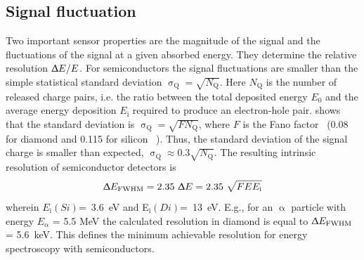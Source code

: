 \subsection{Signal fluctuation}
Two important sensor properties are the magnitude of the signal and the fluctuations of the signal at a given absorbed energy. They determine the relative resolution $\Updelta E/E$. For semiconductors the signal fluctuations are smaller than the simple statistical standard deviation $\upsigma_\mathrm{Q}=\sqrt{N_\mathrm{Q}}$. Here $N_\mathrm{Q}$ is the number of released charge pairs, i.e. the ratio between the total deposited energy $E_\mathrm{0}$ and the average energy deposition $E_\mathrm{i}$ required to produce an electron-hole pair. \cite{1947PhRv...72...26F} shows that the standard deviation is $\upsigma_\mathrm{Q}=\sqrt{F N_\mathrm{Q}}$, where $F$ is the Fano factor~\cite{1947PhRv...72...26F} (0.08 for diamond and 0.115 for silicon ~\cite{1980PhRvB..22.5565A}). Thus, the standard deviation of the signal charge is smaller than expected, $\upsigma_\mathrm{Q}\approx0.3 \sqrt{N_\mathrm{Q}}$. The resulting intrinsic resolution of semiconductor detectors is 
\begin{equation}
\label{eq:efwhm}
\Updelta E_\mathrm{FWHM} = 2.35~\Updelta E = 2.35~\sqrt{FEE_\mathrm{i}} 
\end{equation} 
wherein $E_\mathrm{i}(Si)$=~3.6~eV and E$_\mathrm{i}(Di)$=~13~eV. E.g., for an $\upalpha$ particle with energy $E_\upalpha$ = 5.5 MeV the calculated resolution in diamond is equal to $\Updelta E_{\mathrm{FWHM}}$ = 5.6~keV. This defines the minimum achievable resolution for energy spectroscopy with semiconductors. 
%


